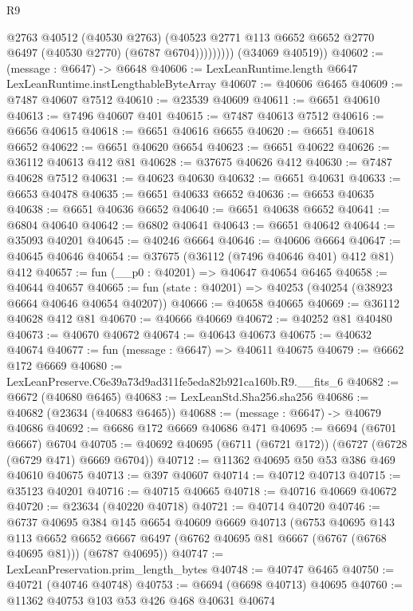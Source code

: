 \begin{lexlean}{R9}
\begin{coremodule}
                    @2763
                    @40512
                    (@40530 @2763)
                    (@40523 @2771 @113 @6652 @6652 @2770 @6497 (@40530 @2770) (@6787 @6704)))))))))
      (@34069 @40519))
@40602 := (message : @6647) -> @6648
@40606 := LexLeanRuntime.length @6647 LexLeanRuntime.instLengthableByteArray
@40607 := @40606 @6465
@40609 := @7487 @40607 @7512
@40610 := @23539 @40609
@40611 := @6651 @40610
@40613 := @7496 @40607 @401
@40615 := @7487 @40613 @7512
@40616 := @6656 @40615
@40618 := @6651 @40616 @6655
@40620 := @6651 @40618 @6652
@40622 := @6651 @40620 @6654
@40623 := @6651 @40622
@40626 := @36112 @40613 @412 @81
@40628 := @37675 @40626 @412
@40630 := @7487 @40628 @7512
@40631 := @40623 @40630
@40632 := @6651 @40631
@40633 := @6653 @40478
@40635 := @6651 @40633 @6652
@40636 := @6653 @40635
@40638 := @6651 @40636 @6652
@40640 := @6651 @40638 @6652
@40641 := @6804 @40640
@40642 := @6802 @40641
@40643 := @6651 @40642
@40644 := @35093 @40201
@40645 := @40246 @6664
@40646 := @40606 @6664
@40647 := @40645 @40646
@40654 := @37675 (@36112 (@7496 @40646 @401) @412 @81) @412
@40657 := fun (__p0 : @40201) => @40647 @40654 @6465
@40658 := @40644 @40657
@40665 := fun (state : @40201) => @40253 (@40254 (@38923 @6664 @40646 @40654 @40207))
@40666 := @40658 @40665
@40669 := @36112 @40628 @412 @81
@40670 := @40666 @40669
@40672 := @40252 @81 @40480
@40673 := @40670 @40672
@40674 := @40643 @40673
@40675 := @40632 @40674
@40677 := fun (message : @6647) => @40611 @40675
@40679 := @6662 @172 @6669
@40680 := LexLeanPreserve.C6e39a73d9ad311fe5eda82b921ca160b.R9.__fits_6
@40682 := @6672 (@40680 @6465)
@40683 := LexLeanStd.Sha256.sha256
@40686 := @40682 (@23634 (@40683 @6465))
@40688 := (message : @6647) -> @40679 @40686
@40692 := @6686 @172 @6669 @40686 @471
@40695 := @6694 (@6701 @6667) @6704
@40705 := @40692 @40695 (@6711 (@6721 @172)) (@6727 (@6728 (@6729 @471) @6669 @6704))
@40712 := @11362 @40695 @50 @53 @386 @469 @40610 @40675
@40713 := @397 @40607
@40714 := @40712 @40713
@40715 := @35123 @40201
@40716 := @40715 @40665
@40718 := @40716 @40669 @40672
@40720 := @23634 (@40220 @40718)
@40721 := @40714 @40720
@40746 := @6737
    @40695
    @384
    @145
    @6654
    @40609
    @6669
    @40713
    (@6753
      @40695
      @143
      @113
      @6652
      @6652
      @6667
      @6497
      (@6762 @40695 @81 @6667 (@6767 (@6768 @40695 @81)))
      (@6787 @40695))
@40747 := LexLeanPreservation.prim_length_bytes
@40748 := @40747 @6465
@40750 := @40721 (@40746 @40748)
@40753 := @6694 (@6698 @40713) @40695
@40760 := @11362 @40753 @103 @53 @426 @468 @40631 @40674

\end{coremodule}
\end{lexlean}
